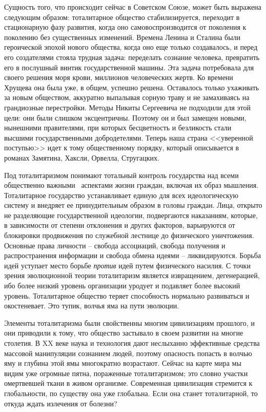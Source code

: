 \documentclass{book}
\begin{document}
Сущность того, что происходит сейчас в Советском Союзе, может быть выражена следующим образом: тоталитарное общество 
стабилизируется, переходит в стационарную фазу развития, когда оно самовоспроизводится от поколения к поколению без существенных 
изменений. Времена Ленина и Сталина были героической эпохой нового общества, когда оно еще только создавалось, и перед его 
создателями стояла трудная задача: переделать сознание человека, превратить его в послушный винтик государственной машины. Эта 
задача потребовала для своего решения моря крови, миллионов человеческих жертв. Ко времени Хрущева она была уже, в общем, 
успешно решена. Оставалось только ухаживать за новым обществом, аккуратно выпалывая сорную траву и не замахиваясь на гран­диозные 
перестройки. Методы Никиты Сергеевича не подхо­дили для этой цели: они были слишком эксцентричны. Поэтому он и был замещен 
новыми, нынешними правителями, при которых бесцветность и безликость стали высшими государственными добродетелями. Теперь наша 
страна <<уверенной поступью>> идет к тому общественному порядку, который описывается в романах Замятина, Хаксли, Орвелла, Стругацких.

Под тоталитаризмом понимают тотальный контроль государства над всеми общественно важными  аспектами жизни граждан, включая их образ мышления. Тоталитарное государ­ство устанавливает единую для всех идеологическую систему и внедряет ее принудительным образом в головы граждан. Лица, открыто не разделяющие государственной идеологии, подвергаются наказаниям, которые, в зависимости от степени отклонения и других факторов, варьируются от блокировки продвижения по служебной лестнице до физического уничтожения. Основные права личности -- свобода ассоциаций, свобода получения и распространения информации и свобода обмена идеями -- ликвидируются. Борьба идей уступает место борьбе \textit{против} идей путем физического насилия. С точки зрения эволюционной теории тоталитаризм является извращением, дегенерацией, ибо более низкий уровень организации уродует и подавляет более высокий уровень. Тоталитарное общество теряет способность нормально развиваться и око­стеневает. Это тупик, волчья яма на пути эволюции.

Элементы тоталитаризма были свойственны многим циви­лизациям прошлого, и они приводили к тому, что общество застывало в своем 
развитии на многие столетия. В XX веке наука и технология дают неслыханно эффективные средства массовой манипуляции сознанием 
людей, поэтому опасность попасть в волчью яму и глубина этой ямы многократно возрастают. Сейчас на карте мира мы видим уже 
огромные пятна, пораженные тоталитаризмом; это словно участки омертвевшей ткани в живом организме. Современная цивилизация 
стремится к глобальности, по существу она уже глобальна. Если она станет тоталитарной, то откуда ждать излечения от болезни?
\end{document}
